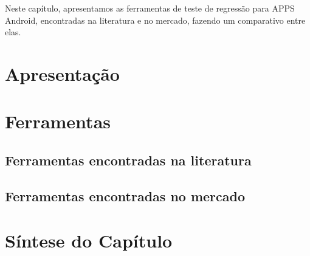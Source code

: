 
Neste capítulo, apresentamos as ferramentas de teste de regressão para \ac{APPS} Android, encontradas na literatura e no mercado, fazendo um comparativo entre elas.

\section{Apresentação}
\section{Ferramentas}
\subsection{Ferramentas encontradas na literatura}
\subsection{Ferramentas encontradas no mercado}
\section{Síntese do Capítulo}
